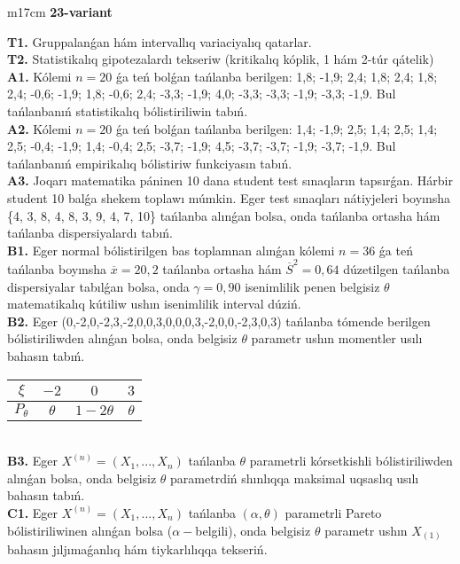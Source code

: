 \documentclass{article}
\begin{document}
\begin{tabular}{m{17cm}}
\textbf{23-variant}
\newline

\textbf{T1.} 
Gruppalanǵan hám intervallıq variaciyalıq qatarlar.
 \\
\textbf{T2.} 
Statistikalıq gipotezalardı tekseriw (kritikalıq kóplik, 1 hám 2-túr qátelik)
 \\
\textbf{A1.} 
Kólemi \(n = 20\) ǵa teń bolǵan tańlanba berilgen: 1,8; -1,9; 2,4; 1,8; 2,4; 1,8; 2,4; -0,6; -1,9; 1,8; -0,6; 2,4; -3,3; -1,9; 4,0; -3,3; -3,3; -1,9; -3,3; -1,9. Bul tańlanbanıń statistikalıq bólistiriliwin tabıń.
 \\
\textbf{A2.} 
Kólemi \(n = 20\) ǵa teń bolǵan tańlanba berilgen: 1,4; -1,9; 2,5; 1,4; 2,5; 1,4; 2,5; -0,4; -1,9; 1,4; -0,4; 2,5; -3,7; -1,9; 4,5; -3,7; -3,7; -1,9; -3,7; -1,9. Bul tańlanbanıń empirikalıq bólistiriw funkciyasın tabıń.
 \\
\textbf{A3.} 
Joqarı matematika páninen 10 dana student test sınaqların tapsırǵan. Hárbir student 10 balǵa shekem toplawı múmkin. Eger test sınaqları nátiyjeleri boyınsha \{4, 3, 8, 4, 8, 3, 9, 4, 7, 10\} tańlanba alınǵan bolsa, onda tańlanba ortasha hám tańlanba dispersiyalardı tabıń.
 \\
\textbf{B1.} 
Eger normal bólistirilgen bas toplamnan alınǵan kólemi \(n = 36\) ǵa teń tańlanba boyınsha \(\overline{x} = 20,2\) tańlanba ortasha hám \({\overline{S}}^{2} = 0,64\) dúzetilgen tańlanba dispersiyalar tabılǵan bolsa, onda \(\gamma = 0,90\) isenimlilik penen belgisiz \(\theta\) matematikalıq kútiliw ushın isenimlilik interval dúziń.
 \\
\textbf{B2.} 
Eger (0,-2,0,-2,3,-2,0,0,3,0,0,0,3,-2,0,0,-2,3,0,3) tańlanba tómende berilgen bólistiriliwden alınǵan bolsa, onda belgisiz \(\theta\) parametr ushın momentler usılı bahasın tabıń.
\begin{tabular}{|c|c|c|c|}
  \hline
$\xi$ & $- 2$  & $0$  & $3$ \\
\hline
\(P_{\theta}\) & \(\theta\) & \(1 - 2\theta\) & \(\theta\) \\
\hline
\end{tabular}
 \\
\textbf{B3.} 
Eger \(X^{(n)} = \left( X_{1},...,X_{n} \right)\) tańlanba \(\theta\) parametrli kórsetkishli bólistiriliwden alınǵan bolsa, onda belgisiz \(\theta\) parametrdiń shınlıqqa maksimal uqsaslıq usılı bahasın tabıń.
 \\
\textbf{C1.} 
Eger \(X^{(n)} = \left( X_{1},...,X_{n} \right)\) tańlanba \((\alpha,\theta)\) parametrli Pareto bólistiriliwinen alınǵan bolsa (\(\alpha -\)belgili), onda belgisiz \(\theta\) parametr ushın \(X_{(1)}\) bahasın jıljımaǵanlıq hám tiykarlılıqqa tekseriń.

\end{tabular}
\end{document}
